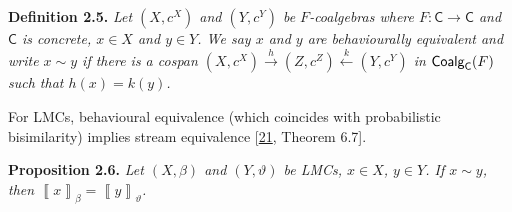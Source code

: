 \hypertarget{html:S2.Thmtheorem5}{} \par\noindent\textbf{\textbf{Definition 2.5}\textbf{.}}\quad  %
\hypertarget{html:S2.Thmtheorem5.p1}{} \emph{Let %
\hypertarget{html:S2.Thmtheorem5.p1.m1}{}\({(X,c^{X})}\) and %
\hypertarget{html:S2.Thmtheorem5.p1.m2}{}\({(Y,c^{Y})}\) be %
\hypertarget{html:S2.Thmtheorem5.p1.m3}{}\({F}\)-coalgebras where %
\hypertarget{html:S2.Thmtheorem5.p1.m4}{}\({F\colon\mathsf{C}\to\mathsf{C}}\) and %
\hypertarget{html:S2.Thmtheorem5.p1.m5}{}\({\mathsf{C}}\) is concrete, %
\hypertarget{html:S2.Thmtheorem5.p1.m6}{}\({x\in X}\) and %
\hypertarget{html:S2.Thmtheorem5.p1.m7}{}\({y\in Y}\). We say %
\hypertarget{html:S2.Thmtheorem5.p1.m8}{}\({x}\) and %
\hypertarget{html:S2.Thmtheorem5.p1.m9}{}\({y}\) are \emph{behaviourally equivalent} and write %
\hypertarget{html:S2.Thmtheorem5.p1.m10}{}\({x\sim y}\) if there is a cospan %
\hypertarget{html:S2.Thmtheorem5.p1.m11}{}\({(X,c^{X})\stackrel{{\scriptstyle h}}{{\longrightarrow}}(Z,c^{Z})\stackrel{{\scriptstyle k}}{{\longleftarrow}}(Y,c^{Y})}\) in %
\hypertarget{html:S2.Thmtheorem5.p1.m12}{}\({\mbox{\sf Coalg}_{\mathsf{C}}(F)}\) such that %
\hypertarget{html:S2.Thmtheorem5.p1.m13}{}\({h(x)=k(y)}\).}
\par\medskip
\hypertarget{html:S2.SS0.SSS0.P0.SPx3.p4}{} For LMCs, behavioural equivalence (which coincides with probabilistic bisimilarity) implies stream equivalence [\hyperlink{html:bib.bib21}{21}, Theorem 6.7].
\par\medskip
\hypertarget{html:S2.Thmtheorem6}{} \par\noindent\textbf{\textbf{Proposition 2.6}\textbf{.}}\quad  %
\hypertarget{html:S2.Thmtheorem6.p1}{} \emph{Let %
\hypertarget{html:S2.Thmtheorem6.p1.m1}{}\({(X,\beta)}\) and %
\hypertarget{html:S2.Thmtheorem6.p1.m2}{}\({(Y,\vartheta)}\) be LMCs, %
\hypertarget{html:S2.Thmtheorem6.p1.m3}{}\({x\in X}\), %
\hypertarget{html:S2.Thmtheorem6.p1.m4}{}\({y\in Y}\). If %
\hypertarget{html:S2.Thmtheorem6.p1.m5}{}\({x\sim y}\), then %
\hypertarget{html:S2.Thmtheorem6.p1.m6}{}\({\left\llbracket{x}\right\rrbracket_{\beta}=\left\llbracket{y}\right\rrbracket_{\vartheta}}\).}
